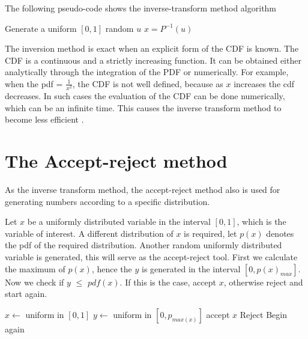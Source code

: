    
The following pseudo-code shows the inverse-transform method algorithm 
\begin{algorithmic}
\State Generate a uniform $[0,1]$ random $u$
\State \Return $x = P^{-1}(u)$
\end{algorithmic}

The inversion method is exact when an explicit form of the CDF is known. The CDF is a continuous and a strictly increasing function. It can be obtained either analytically through the integration of the PDF or numerically. For example, when the pdf = $\frac{1}{x^2}$, the CDF is not well defined, because as $x$ increases the cdf decreases. In such cases the evaluation of the CDF can be done numerically, which can be an infinite time.
This causes the inverse transform method to become less efficient \citep{Devroye:1986:SNR:318242.318443}.


\section{The Accept-reject method}
As the inverse transform method, the accept-reject method also is used for generating numbers according to a specific distribution.

Let $x$ be a uniformly distributed variable in the interval $[0,1]$, which is the variable of interest. A different distribution of $x$ is required, let $p(x)$ denotes the pdf of the required distribution.
Another  random uniformly distributed variable is generated, this will serve as the accept-reject tool. First we calculate the maximum of $p(x)$, hence the $y$ is generated in the interval $[0,p(x)_{max}]$.
Now we check if $y$ $\leq$ $pdf(x)$. If this is the case, accept $x$, otherwise reject and start again. 
\begin{algorithmic} 
\State $x \gets$ uniform in $[0, 1]$
\State $y \gets$ uniform in $[0, p_{max(x)}]$
    \State accept $x$
\Else 
	\State Reject 
\EndIf
\State Begin again
\end{algorithmic}
% 

